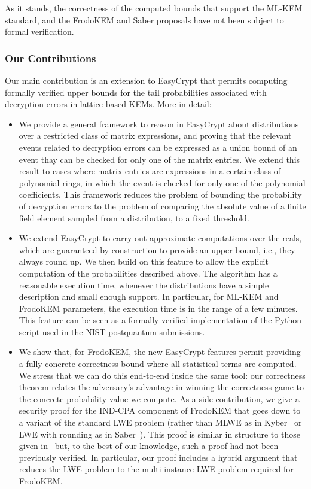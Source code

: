 As it stands, the correctness of the computed bounds that support the ML-KEM standard, and the FrodoKEM and Saber proposals have not been subject to formal verification. 

\subsubsection*{Our Contributions}
Our main contribution is an extension to EasyCrypt that permits computing formally verified upper bounds for the tail probabilities associated with decryption errors in lattice-based KEMs.
More in detail:
\begin{itemize}[leftmargin=*]
  \item We provide a general framework to reason in EasyCrypt about distributions over a restricted class of matrix expressions, and proving that the relevant events related to decryption errors can be expressed as a union bound of an event thay can be checked for only one of the matrix entries. We extend this result to cases where matrix entries are expressions in a certain class of polynomial rings, in which the event is checked for only one of the polynomial coefficients. This framework reduces the problem of bounding the probability of decryption errors to the problem of comparing the absolute value of a finite field element sampled from a distribution, to a fixed threshold.
  \item We extend EasyCrypt to carry out approximate computations over the reals, which are guaranteed by construction to provide an upper bound, i.e., they always round up. We then build on this feature to allow the explicit computation of the probabilities described above. The algorithm has a reasonable execution time, whenever the distributions have a simple description and small enough support. In particular, for ML-KEM and FrodoKEM parameters, the execution time is in the range of a few minutes. This feature can be seen as a formally verified implementation of the Python script used in the NIST postquantum submissions.
  \item We show that, for FrodoKEM, the new EasyCrypt features permit providing a fully concrete correctness bound where all statistical terms are computed. We stress that we can do this end-to-end inside the same tool: our correctness theorem relates the adversary's advantage in winning the correctness game to the concrete probability value we compute. As a side contribution, we give a security proof for the IND-CPA component of FrodoKEM that goes down to a variant of the standard LWE problem (rather than MLWE as in Kyber~\cite{} or LWE with rounding as in Saber~\cite{}). This proof is similar in structure to those given in~\cite{} but, to the best of our knowledge, such a proof had not been previously verified. In particular, our proof includes a hybrid argument that reduces the LWE problem to the multi-instance LWE problem required for FrodoKEM.

\end{itemize}
